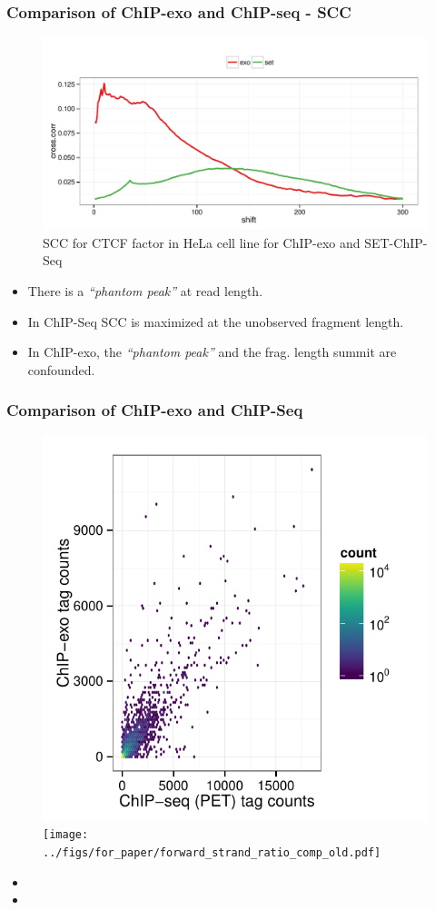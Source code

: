 \documentclass[table,xcolor=dvipsnames]{beamer}\usepackage[]{graphicx}\usepackage[]{color}
\begin{document}
\begin{frame}[plain]
  \frametitle{Comparison of ChIP-exo and ChIP-seq - SCC}  
\begin{figure}[H]
  \centering  
\includegraphics[width = .7\textwidth]{../figs/for_paper/scc_ctcf.pdf}
\caption{SCC for CTCF factor in HeLa cell line for ChIP-exo and
  SET-ChIP-Seq }
  \label{fig:scc}
\end{figure}

\begin{itemize}
\item There is a \emph{``phantom peak''} at read length.
\item In ChIP-Seq SCC is maximized at the unobserved fragment length.
\item In ChIP-exo, the \emph{``phantom peak''} and the frag. length
  summit are confounded.
\end{itemize}

\end{frame}


\begin{frame}
  \frametitle{Comparison of ChIP-exo and ChIP-Seq}

\begin{figure}[H]
  \centering
  \includegraphics[width = .5\textwidth,page = 3 ]{../figs/for_paper/ChIPseqPET_ChIPexo_tagCount_comparison.pdf}
  \texttt{[image: ../figs/for\_paper/forward\_strand\_ratio\_comp\_old.pdf]}
\end{figure}

\begin{itemize}
\item
\item 
\end{itemize}

\end{frame}
\end{document}

